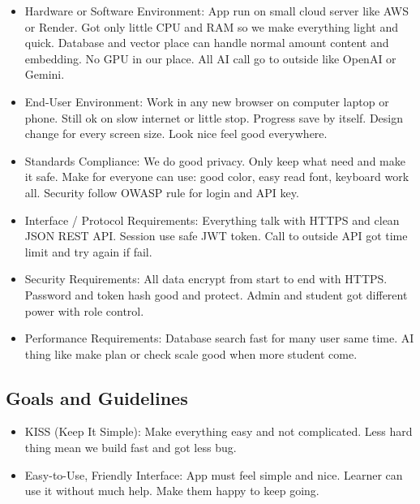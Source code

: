 \documentclass{FastFyp}
\begin{document}
\begin{itemize}
    \item Hardware or Software Environment:
    App run on small cloud server like AWS or Render. Got only little CPU and RAM so we make everything light and quick.
    Database and vector place can handle normal amount content and embedding.
    No GPU in our place. All AI call go to outside like OpenAI or Gemini.

    \item End-User Environment:
    Work in any new browser on computer laptop or phone.
    Still ok on slow internet or little stop. Progress save by itself.
    Design change for every screen size. Look nice feel good everywhere.

    \item Standards Compliance:
    We do good privacy. Only keep what need and make it safe.
    Make for everyone can use: good color, easy read font, keyboard work all.
    Security follow OWASP rule for login and API key.

    \item Interface / Protocol Requirements:
    Everything talk with HTTPS and clean JSON REST API.
    Session use safe JWT token.
    Call to outside API got time limit and try again if fail.

    \item Security Requirements:
    All data encrypt from start to end with HTTPS.
    Password and token hash good and protect.
    Admin and student got different power with role control.

    \item Performance Requirements:
    Database search fast for many user same time.
    AI thing like make plan or check scale good when more student come.
\end{itemize}
\subsection{Goals and Guidelines}

\begin{itemize}
  \item KISS (Keep It Simple): Make everything easy and not complicated. Less hard thing mean we build fast and got less bug.
  \item Easy-to-Use, Friendly Interface: App must feel simple and nice. Learner can use it without much help. Make them happy to keep going.
\end{itemize}
\end{document}
